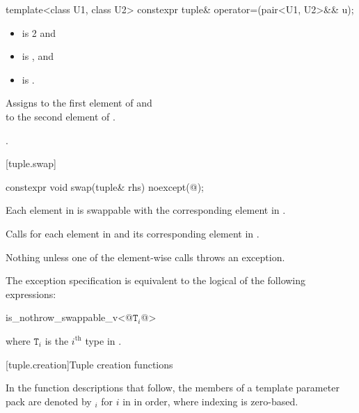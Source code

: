 %
%
\begin{itemdecl}
template<class U1, class U2> constexpr tuple& operator=(pair<U1, U2>&& u);
\end{itemdecl}

\begin{itemdescr}
\pnum
\constraints
\begin{itemize}
\item {} is 2 and
\item {} is , and
\item {} is .
\end{itemize}

\pnum
\effects
Assigns  to the first
element of  and\\  to the
second element of .

\pnum
\returns
{}.
\end{itemdescr}

[tuple.swap]{}

%
\begin{itemdecl}
constexpr void swap(tuple& rhs) noexcept(@\seebelow@);
\end{itemdecl}

\begin{itemdescr}
\pnum
\expects
Each element in  is swappable with
the corresponding element in .

\pnum
\effects
Calls  for each element in  and its
corresponding element in .

\pnum
\throws
Nothing unless one of the element-wise  calls throws an exception.

\pnum
\remarks
The exception specification is equivalent to the logical
 of the following expressions:
\begin{codeblock}
is_nothrow_swappable_v<@$\mathtt{T}_i$@>
\end{codeblock}
where $\mathtt{T}_i$ is the $i^\text{th}$ type in .
\end{itemdescr}

[tuple.creation]{Tuple creation functions}

\pnum
In the function descriptions that follow, the members of a template parameter pack 
are denoted by $_i$ for $i$ in  in
order, where indexing is zero-based.

